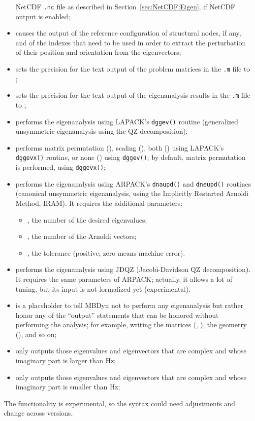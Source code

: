 \begin{itemize}
	NetCDF \texttt{.nc} file as described in 
	Section~\ref{sec:NetCDF:Eigen}, if NetCDF output is enabled;
\item {} causes the output of the reference
	configuration of structural nodes, if any,
	and of the indexes that need to be used in order to extract
	the perturbation of their position and orientation
	from the eigenvectors;
\item {} sets the precision for the text output
  	of the problem matrices in the \texttt{.m} file to 
        ;
\item {} sets the precision for the text output
  	of the eigenanalysis results in the \texttt{.m} file to
	;
\item {} performs the eigenanalysis using
	LAPACK's \texttt{dggev()} routine (generalized unsymmetric eigenanalysis
	using the QZ decomposition);
\item {} performs matrix permutation (),
	scaling (), both () using LAPACK's
	\texttt{dggevx()} routine, or none () using \texttt{dggev()};
	by default, matrix permutation is performed, using \texttt{dggevx()};
\item {} performs the eigenanalysis using
	ARPACK's \texttt{dnaupd()} and \texttt{dneupd()} routines
	(canonical unsymmetric eigenanalysis,
	using the Implicitly Restarted Arnoldi Method, IRAM).
	It requires the additional parameters:
	\begin{itemize}
	\item {}, the number of the desired eigenvalues;
	\item {}, the number of the Arnoldi vectors;
	\item {}, the tolerance (positive; zero means machine error).
	\end{itemize}
\item {} performs the eigenanalysis using JDQZ (Jacobi-Davidson QZ
	decomposition).
	It requires the same parameters of ARPACK;
	actually, it allows a lot of tuning, but its input
	is not formalized yet (experimental).
\item {} is a placeholder to tell MBDyn not to perform any eigenanalysis
	but rather honor any of the ``output'' statements that can be honored without performing the analysis;
	for example, writing the matrices (, ),
	the geometry (), and so on;
\item {} only outputs those eigenvalues and eigenvectors
	that are complex and whose imaginary part is larger than
	 Hz;
\item {} only outputs those eigenvalues and eigenvectors
	that are complex and whose imaginary part is smaller than
	 Hz;
\end{itemize}
The  functionality is experimental,
so the syntax could need adjustments and change across versions.

